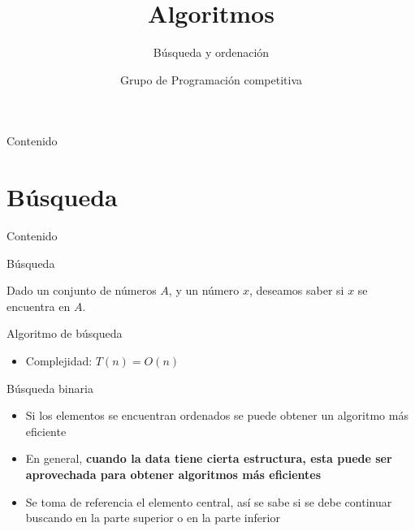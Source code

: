 \documentclass[]{beamer}
\title{Algoritmos}
\subtitle{B\'usqueda y ordenaci\'on}
\author{Grupo de Programaci\'on competitiva}
\institute{Taller de Programaci\'on}
\date{}
\begin{document}
\maketitle

\begin{frame}{Contenido}
\tableofcontents
\end{frame}

\section{B\'usqueda}
\begin{frame}{Contenido}
\tableofcontents[currentsection]
\end{frame}

\begin{frame}{B\'usqueda}
  \begin{definition}
    Dado un conjunto de n\'umeros $A$, y un n\'umero $x$, deseamos saber si $x$
    se encuentra en $A$.
  \end{definition}
\end{frame}

\begin{frame}{Algoritmo de b\'usqueda}
  \begin{algorithm}[H]
    \BlankLine
    {
      {
      }
    }
  \end{algorithm}
  \pause
  \begin{itemize}
    \item Complejidad: \pause $T(n)=O(n)$
  \end{itemize}
\end{frame}

\begin{frame}{B\'usqueda binaria}
  \begin{itemize}
    \item Si los elementos se encuentran ordenados se puede obtener un algoritmo m\'as eficiente
      \pause
    \item En general, \textbf{cuando la data tiene cierta estructura, esta puede ser aprovechada para obtener algoritmos m\'as eficientes}
      \pause
    \item Se toma de referencia el elemento central, as\'i se sabe si se debe continuar buscando en la parte superior o en la parte inferior
  \end{itemize}
\end{frame}
\end{document}
